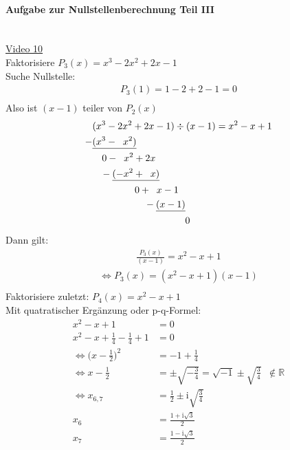 \paragraph{Aufgabe zur Nullstellenberechnung Teil III}$  $\vspace*{3mm}\\
\href{https://youtu.be/I40ZrXwe9rc}{Video 10}\\
Faktorisiere $ P_3(x)=x^3-2x^2+2x-1 $\\
Suche Nullstelle:\\
\begin{align*}
P_3(1)=1-2+2-1=0\\
\end{align*}
Also ist $ (x-1) $ teiler von $ P_2(x) $\\
\begin{align*}
&(x^3-2x^2+2x-1)\div (x-1)=x^2-x+1\\
-&\underline{(x^3-\;\;x^2)}\\
&\hspace{0.35cm}0-\;\;x^2+2x\\
&\hspace{0.3cm}-\underline{(-x^2+\;\;x)}\\
&\hspace{1.55cm}0+\;\;x-1\\
&\hspace{1.9cm}-\underline{(x-1)}\\
&\hspace{3.4cm}0\\
\end{align*}
Dann gilt:\\
\begin{align*}
\frac{P_3(x)}{(x-1)}=x^2-x+1
\end{align*}
\begin{align*}
\Leftrightarrow P_3(x)=(x^2-x+1)(x-1)\\
\end{align*}
Faktorisiere zuletzt: $ P_4(x)=x^2-x+1 $\\
Mit quatratischer Ergänzung oder p-q-Formel:\\
\begin{align*}
x^2-x+1&=0\\
x^2-x+\frac{1}{4}-\frac{1}{4}+1&=0\\
\Leftrightarrow\bigg(x-\frac{1}{2}\bigg)^2&=-1+\frac{1}{4}\\
\Leftrightarrow x-\frac{1}{2}&=\pm\sqrt{-\frac{3}{4}}=\sqrt{-1}\pm\sqrt{\frac{3}{4}}\;\;\notin \mathbb{R}\\
\Leftrightarrow x_{6,7}&=\frac{1}{2}\pm \mathrm{i} \sqrt{\frac{3}{4}}\\
x_6&=\frac{1+\mathrm{i}\sqrt{3}}{2}\\
x_7&=\frac{1-\mathrm{i}\sqrt{3}}{2}\\
\end{align*}
